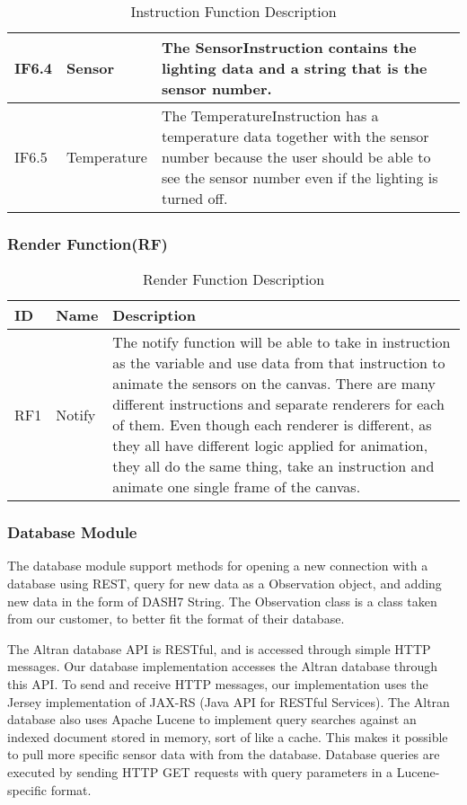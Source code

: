 \documentclass[../document]{subfiles}
\begin{document}
\begin{table}[H]
\caption{Instruction Function Description}
\centering
\begin{tabularx}{\textwidth}{|L{1.2cm}|L{3.5cm}|X|}
	\hline
	IF6.4
	&Sensor
	&The SensorInstruction contains the lighting data and a string that is the sensor number.
	\\ \hline IF6.5
	&Temperature
	&The TemperatureInstruction has a temperature data together with the sensor number because the user should be able to see the sensor number even if the lighting is turned off.
	\\ \hline 
\end{tabularx}
\end{table}

\subsubsection{Render Function(RF)}
\begin{table}[H]
\caption{Render Function Description}
\centering
\begin{tabularx}{\textwidth}{|L{1.2cm}|L{3.5cm}|X|}
	\hline
	ID
	&Name
	&Description
	\\ \hline RF1
	&Notify
	&The notify function will be able to take in instruction as the variable and use data from that instruction to animate the sensors on the canvas. There are many different instructions and separate renderers for each of them. Even though each renderer is different, as they all have different logic applied for animation, they all do the same thing, take an instruction and animate one single frame of the canvas.
	\\ \hline 
\end{tabularx}
\end{table}

\subsubsection{Database Module}
The database module support methods for opening a new connection with a database using \gls{REST}, query for new data as a Observation object, and adding new data in the form of \gls{DASH7} String. The Observation class is a class taken from our customer, to better fit the format of their database.

The \gls{Altran} database \gls{API} is RESTful, and is accessed through simple \gls{HTTP} messages. Our database implementation accesses the \gls{Altran} database through this \gls{API}. To send and receive \gls{HTTP} messages, our implementation uses the Jersey implementation of JAX-RS (\gls{Java} \gls{API} for RESTful Services). The \gls{Altran} database also uses Apache Lucene to implement query searches against an indexed document stored in memory, sort of like a cache. This makes it possible to pull more specific sensor data with from the database. Database queries are executed by sending \gls{HTTP} GET requests with query parameters in a Lucene-specific format.
\end{document}
